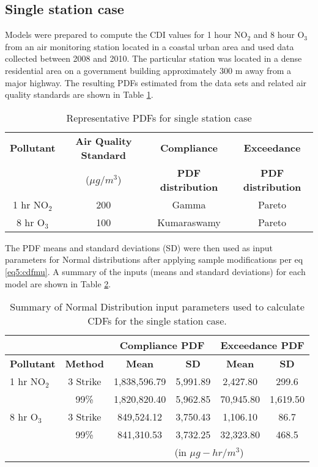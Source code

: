 \subsection{Single station case}
Models were prepared to compute the CDI values for 1 hour NO$_{2}$ and 8 hour O$_{3}$ from an air monitoring station located in a coastal urban area and used data collected between 2008 and 2010.  The particular station was located in a dense residential area on a government building approximately 300 m away from a major highway. The resulting PDFs estimated from the data sets and related air quality standards are shown in Table \ref{tb5:singlePDF}.
%
\begin{table}[!htb]
\centering
\caption{Representative PDFs for single station case}
\label{tb5:singlePDF}
\begin{tabular}{@{}cccc@{}}
\toprule
\textbf{Pollutant} & \textbf{Air Quality Standard}  & \textbf{Compliance} & \textbf{Exceedance} \\ 
 &($\mu g/m^{3}$) &\textbf{PDF distribution} & \textbf{PDF distribution} \\ \midrule
1 hr NO$_{2}$ & 200 & Gamma & Pareto \\
8 hr O$_{3}$ & 100 & Kumaraswamy & Pareto \\ \bottomrule
\end{tabular}
\end{table}
%
The PDF means and standard deviations (SD) were then used as input parameters for Normal distributions after applying sample modifications per eq \ref{eq5:cdfmu}.  A summary of the inputs (means and standard deviations) for each model are shown in Table \ref{tb6:singleInputs}.
%
\begin{table}[!htb]
\centering
\caption{Summary of Normal Distribution input parameters used to calculate CDFs for the single station case.} 
\label{tb6:singleInputs}
\begin{tabular}{@{}lccccc@{}}
\toprule
\textbf{} & \textbf{} & \multicolumn{2}{c}{\textbf{Compliance PDF}} & \multicolumn{2}{c}{\textbf{Exceedance PDF}} \\ \midrule
\textbf{Pollutant} & \textbf{Method} & \textbf{Mean} & \textbf{SD} & \textbf{Mean} & \textbf{SD} \\
1 hr NO$_{2}$ & 3 Strike & 1,838,596.79 & 5,991.89 & 2,427.80 & 299.6 \\
 & 99\% & 1,820,820.40 & 5,962.85 & 70,945.80 & 1,619.50 \\
8 hr O$_{3}$ & 3 Strike & 849,524.12 & 3,750.43 & 1,106.10 & 86.7 \\
 & 99\% & 841,310.53 & 3,732.25 & 32,323.80 & 468.5 \\ \bottomrule
 &  & \multicolumn{4}{c}{(in $\mu g-hr/m^{3}$)} \\ 
\end{tabular}
\end{table}

